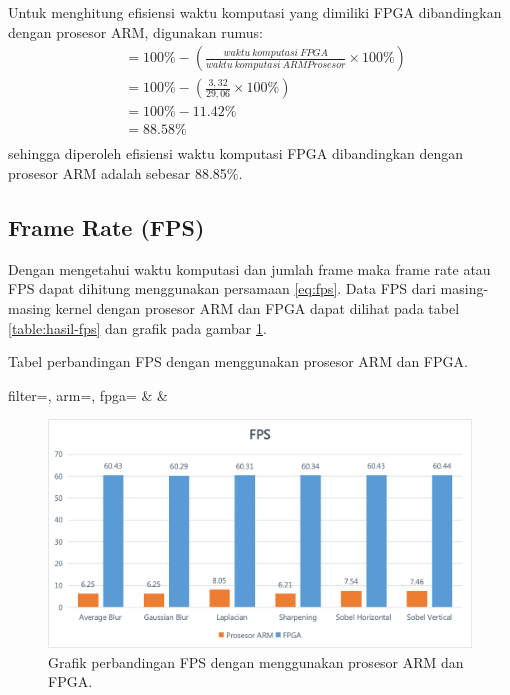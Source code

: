 Untuk menghitung efisiensi waktu komputasi yang dimiliki FPGA dibandingkan dengan prosesor ARM, digunakan rumus:
\begin{equation*}
    \begin{split}
& = 100\% - \left( \frac{waktu\ komputasi\ FPGA}{waktu\ komputasi\ ARM Prosesor} \times 100\% \right) \\
& = 100\% - \left( \frac{3,32}{29,06} \times 100\% \right) \\
& = 100\% - 11.42\% \\
& = 88.58\% \\
    \end{split}
\end{equation*}
sehingga diperoleh efisiensi waktu komputasi FPGA dibandingkan dengan prosesor ARM adalah sebesar 88.85\%.

\subsection{Frame Rate (FPS)}
Dengan mengetahui waktu komputasi dan jumlah frame maka frame rate atau FPS dapat dihitung menggunakan persamaan \ref{eq:fps}. Data FPS dari masing-masing kernel dengan prosesor ARM dan FPGA dapat dilihat pada tabel \ref{table:hasil-fps} dan grafik pada gambar \ref{fig:chart-fps}.
\begin{atable}
    \caption{Tabel perbandingan FPS dengan menggunakan prosesor ARM dan FPGA.}
    \label{table:hasil-fps}
        {
            filter=\filter, 
            arm=\arm, 
            fpga=\fpga}
        {
            \filter & 
            \arm & 
            \fpga }
\end{atable}
\begin{figure}[H]
    \includegraphics[width=0.81\linewidth, center]{images/chart/chart-fps.png}
    \caption{Grafik perbandingan FPS dengan menggunakan prosesor ARM dan FPGA.}
    \label{fig:chart-fps}
\end{figure}

